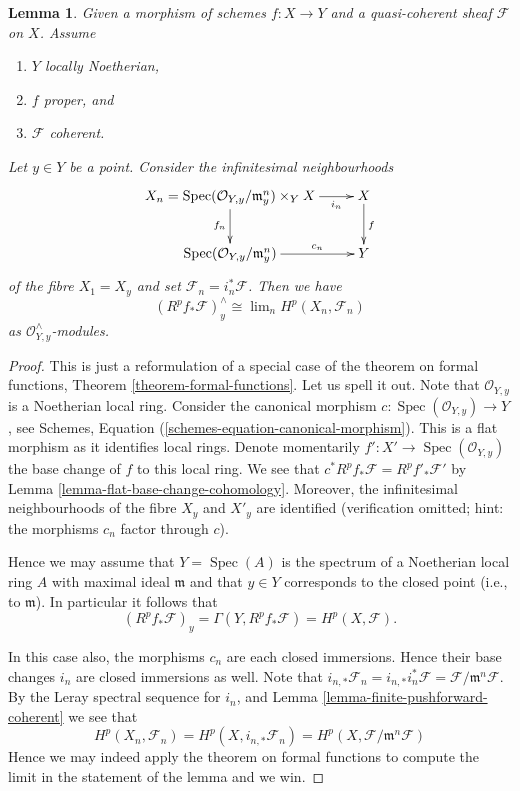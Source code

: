 \documentclass{stacks-project}
\theoremstyle{plain}
\newtheorem{lemma}[subsection]{Lemma}
\theoremstyle{definition}
\theoremstyle{remark}
\numberwithin{equation}{subsection}
\def\lim{\mathop{\mathrm{lim}}\nolimits}
\def\Spec{\mathop{\mathrm{Spec}}}
\begin{document}
\begin{lemma}
\label{lemma-formal-functions-stalk}
Given a morphism of schemes $f : X \to Y$ and a quasi-coherent sheaf
$\mathcal{F}$ on $X$. Assume
\begin{enumerate}
\item $Y$ locally Noetherian,
\item $f$ proper, and
\item $\mathcal{F}$ coherent.
\end{enumerate}
Let $y \in Y$ be a point. Consider the infinitesimal neighbourhoods
$$
\xymatrix{
X_n =
\Spec(\mathcal{O}_{Y, y}/\mathfrak m_y^n) \times_Y X
\ar[r]_-{i_n} \ar[d]_{f_n} &
X \ar[d]^f \\
\Spec(\mathcal{O}_{Y, y}/\mathfrak m_y^n) \ar[r]^-{c_n} & Y
}
$$
of the fibre $X_1 = X_y$ and set $\mathcal{F}_n = i_n^*\mathcal{F}$.
Then we have
$$
\left(R^pf_*\mathcal{F}\right)_y^\wedge
\cong
\lim_n H^p(X_n, \mathcal{F}_n)
$$
as $\mathcal{O}_{Y, y}^\wedge$-modules.
\end{lemma}

\begin{proof}
This is just a reformulation of a special case of the theorem
on formal functions, Theorem \ref{theorem-formal-functions}.
Let us spell it out. Note that $\mathcal{O}_{Y, y}$ is a Noetherian
local ring. Consider the canonical morphism
$c : \Spec(\mathcal{O}_{Y, y}) \to Y$, see
Schemes, Equation (\ref{schemes-equation-canonical-morphism}).
This is a flat morphism as it identifies local rings.
Denote momentarily $f' : X' \to \Spec(\mathcal{O}_{Y, y})$
the base change of $f$ to this local ring. We see that
$c^*R^pf_*\mathcal{F} = R^pf'_*\mathcal{F}'$ by
Lemma \ref{lemma-flat-base-change-cohomology}.
Moreover, the infinitesimal neighbourhoods of
the fibre $X_y$ and $X'_y$ are identified (verification omitted; hint:
the morphisms $c_n$ factor through $c$).

\medskip\noindent
Hence we may assume that $Y = \Spec(A)$ is the spectrum of
a Noetherian local ring $A$ with maximal ideal $\mathfrak m$
and that $y \in Y$ corresponds to the closed point (i.e., to $\mathfrak m$).
In particular it follows that
$$
\left(R^pf_*\mathcal{F}\right)_y =
\Gamma(Y, R^pf_*\mathcal{F}) =
H^p(X, \mathcal{F}).
$$

\medskip\noindent
In this case also, the morphisms $c_n$ are each closed immersions.
Hence their base changes $i_n$ are closed immersions as well.
Note that $i_{n, *}\mathcal{F}_n = i_{n, *}i_n^*\mathcal{F}
= \mathcal{F}/\mathfrak m^n\mathcal{F}$. By the Leray spectral sequence
for $i_n$, and Lemma \ref{lemma-finite-pushforward-coherent} we see that
$$
H^p(X_n, \mathcal{F}_n) =
H^p(X, i_{n, *}\mathcal{F}_n) =
H^p(X, \mathcal{F}/\mathfrak m^n\mathcal{F})
$$
Hence we may indeed apply the theorem on formal functions to compute
the limit in the statement of the lemma and we win.
\end{proof}
\end{document}
